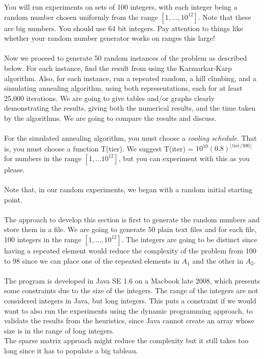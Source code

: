 \documentclass[tikz, 12pt]{scrartcl}
\begin{document}
You will run experiments on sets of 100 integers, with each integer being a random number chosen uniformly from the range $[1, \ldots, 10^{12}]$. Note that these are big numbers. You should use 64 bit integers. Pay attention to things like whether your random number generator works on ranges this large!\\
\\
Now we proceed to generate 50 random instances of the problem as described below. For each instance, find the result from using the Karmarkar-Karp algorithm. Also, for each instance, run a repeated random, a hill climbing, and a simulating annealing algorithm, using both representations, each for at least 25,000 iterations. We are going to give tables and/or graphs clearly demonstrating the results, giving both the numerical results, and the time taken by the algorithms. We are going to compare the results and discuss.\\
\\
For the simulated annealing algorithm, you must choose a \textit{cooling schedule}. That is, you must choose a function T(tier). We suggest T(iter) = $10^{10}(0.8)^{\lfloor \mbox{tier} / 300\rfloor}$ for numbers in the range $[1, \ldots 10^{12}]$, but you can experiment with this as you please.\\
\\
Note that, in our random experiments, we began with a random initial starting point.\\
\\
The approach to develop this section is first to generate the random numbers and store them in a file. We are going to generate 50 plain text files and for each file, 100 integers in the range $[1, \ldots, 10^{12}]$. The integers are going to be distinct since having a repeated element would reduce the complexity of the problem from 100 to 98 since we can place one of the repeated elements in $A_1$ and the other in $A_2$.\\ 
\\
The program is developed in Java SE 1.6 on a Macbook late 2008, which presents some constraints due to the size of the integers. The range of the integers are not considered integers in Java, but long integers. This puts a constraint if we would want to also run the experiments using the dynamic programming approach, to validate the results from the heuristics,  since Java cannot create an array whose size is in the range of long integers. \\
The sparse matrix approach might reduce the complexity but it still takes too long since it has to populate a big tableau.\\
\end{document}
